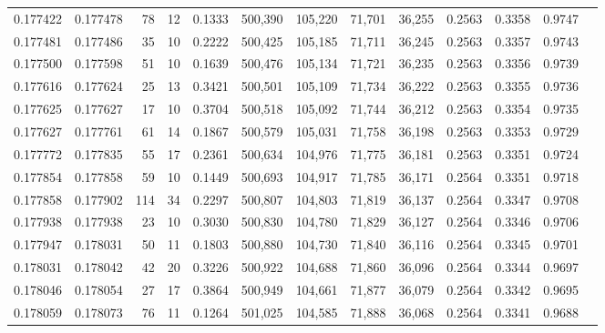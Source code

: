 \begin{tabular}{rrrrrrrrrrrrr}
0.177422 & 0.177478 &    78 &  12 &                                     0.1333 & 500,390 & 105,220 &  71,701 &  36,255 & 0.2563 & 0.3358 & 0.9747 \\
0.177481 & 0.177486 &    35 &  10 &                                     0.2222 & 500,425 & 105,185 &  71,711 &  36,245 & 0.2563 & 0.3357 & 0.9743 \\
0.177500 & 0.177598 &    51 &  10 &                                     0.1639 & 500,476 & 105,134 &  71,721 &  36,235 & 0.2563 & 0.3356 & 0.9739 \\
0.177616 & 0.177624 &    25 &  13 &                                     0.3421 & 500,501 & 105,109 &  71,734 &  36,222 & 0.2563 & 0.3355 & 0.9736 \\
0.177625 & 0.177627 &    17 &  10 &                                     0.3704 & 500,518 & 105,092 &  71,744 &  36,212 & 0.2563 & 0.3354 & 0.9735 \\
0.177627 & 0.177761 &    61 &  14 &                                     0.1867 & 500,579 & 105,031 &  71,758 &  36,198 & 0.2563 & 0.3353 & 0.9729 \\
0.177772 & 0.177835 &    55 &  17 &                                     0.2361 & 500,634 & 104,976 &  71,775 &  36,181 & 0.2563 & 0.3351 & 0.9724 \\
0.177854 & 0.177858 &    59 &  10 &                                     0.1449 & 500,693 & 104,917 &  71,785 &  36,171 & 0.2564 & 0.3351 & 0.9718 \\
0.177858 & 0.177902 &   114 &  34 &                                     0.2297 & 500,807 & 104,803 &  71,819 &  36,137 & 0.2564 & 0.3347 & 0.9708 \\
0.177938 & 0.177938 &    23 &  10 &                                     0.3030 & 500,830 & 104,780 &  71,829 &  36,127 & 0.2564 & 0.3346 & 0.9706 \\
0.177947 & 0.178031 &    50 &  11 &                                     0.1803 & 500,880 & 104,730 &  71,840 &  36,116 & 0.2564 & 0.3345 & 0.9701 \\
0.178031 & 0.178042 &    42 &  20 &                                     0.3226 & 500,922 & 104,688 &  71,860 &  36,096 & 0.2564 & 0.3344 & 0.9697 \\
0.178046 & 0.178054 &    27 &  17 &                                     0.3864 & 500,949 & 104,661 &  71,877 &  36,079 & 0.2564 & 0.3342 & 0.9695 \\
0.178059 & 0.178073 &    76 &  11 &                                     0.1264 & 501,025 & 104,585 &  71,888 &  36,068 & 0.2564 & 0.3341 & 0.9688 \\

\end{tabular}
